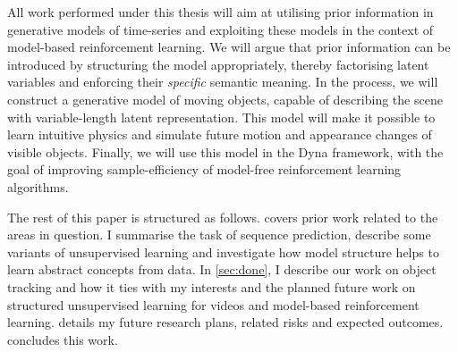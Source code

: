     All work performed under this thesis will aim at utilising prior information in generative models of time-series and exploiting these models in the context of model-based reinforcement learning. We will argue that prior information can be introduced by structuring the model appropriately, thereby factorising latent variables and enforcing their \emph{specific} semantic meaning. In the process, we will construct a generative model of moving objects, capable of describing the scene with variable-length latent representation. This model will make it possible to learn intuitive physics and simulate future motion and appearance changes of visible objects. Finally, we will use this model in the Dyna \citep{Sutton1991} framework, with the goal of improving sample-efficiency of model-free reinforcement learning algorithms.
    
    The rest of this paper is structured as follows.
     covers prior work related to the areas in question.
    I summarise the task of sequence prediction, describe some variants of unsupervised learning and investigate how model structure helps to learn abstract concepts from data.
    In \cref{sec:done}, I describe our work on object tracking and how it ties with my interests and the planned future work on structured unsupervised learning for videos and model-based reinforcement learning.
     details my future research plans, related risks and expected outcomes.
     concludes this work.